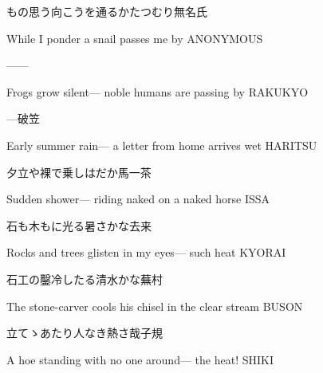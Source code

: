 \begin{haiku}
    {もの思う向こうを通るかたつむり}\hfill{\FH 無名氏}

    \vin{} While I ponder
    \vin{} \vin{} a snail
    \vin{} \vin{} \vin{} passes me by \hspace{\fill} ANONYMOUS
\end{haiku}

\begin{haiku}
   ---\hfill{---}

    \vin{} Frogs grow silent---
    \vin{} \vin{} noble humans
    \vin{} \vin{} \vin{} are passing by \hspace{\fill} RAKUKYO
\end{haiku}

\begin{haiku}
    {---}\hfill{\FH 破笠}

    \vin{} Early summer rain---
    \vin{} \vin{} a letter from home
    \vin{} \vin{} \vin{} arrives wet \hspace{\fill} HARITSU
\end{haiku}

\begin{haiku}
    {\FH 夕立や裸で乗しはだか馬}\hfill{\FH 一茶}

    \vin{} Sudden shower---
    \vin{} \vin{} riding naked
    \vin{} \vin{} \vin{} on a naked horse \hspace{\fill} ISSA
\end{haiku}

\begin{haiku}
    {\FH 石も木もに光る暑さかな}\hfill{\FH 去来}

    \vin{} Rocks and trees
    \vin{} \vin{} glisten in my eyes---
    \vin{} \vin{} \vin{} such heat \hspace{\fill} KYORAI
\end{haiku}

\begin{haiku}
    {\FH 石工の鑿冷したる清水かな}\hfill{\FH 蕪村}

    \vin{} The stone-carver
    \vin{} \vin{} cools his chisel
    \vin{} \vin{} \vin{} in the clear stream \hspace{\fill} BUSON
\end{haiku}

\begin{haiku}
    {\FH {}立てゝあたり人なき熱さ哉}\hfill{\FH 子規}

    \vin{} A hoe standing
    \vin{} \vin{} with no one around---
    \vin{} \vin{} \vin{} the heat! \hspace{\fill} SHIKI
\end{haiku}

